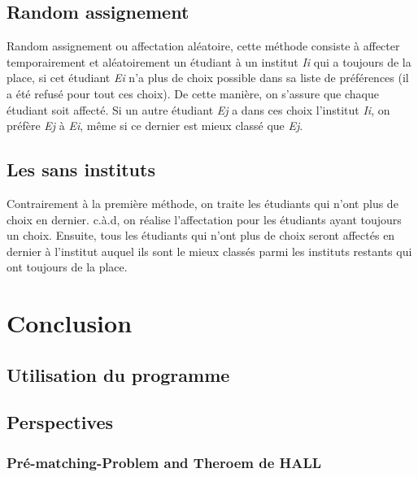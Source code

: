 \documentclass[12pt,titlepage]{article}
\begin{document}
\subsection{Random assignement}
Random assignement ou affectation aléatoire, cette méthode consiste à affecter temporairement et aléatoirement un étudiant à un institut \textit{Ii} qui a toujours de la place, si cet étudiant \textit{Ei} n'a plus de choix possible dans sa liste de préférences (il a été refusé pour tout ces choix). De cette manière, on s'assure que chaque étudiant soit affecté. Si un autre étudiant \textit{Ej} a dans ces choix l'institut \textit{Ii}, on préfère \textit{Ej} à \textit{Ei}, même si ce dernier est mieux classé que \textit{Ej}.
\subsection{Les sans instituts}
Contrairement à la première méthode, on traite les étudiants qui n'ont plus de choix en dernier. c.à.d, on réalise l'affectation pour les étudiants ayant toujours un choix. Ensuite, tous les étudiants qui n'ont plus de choix seront affectés en dernier à l'institut auquel ils sont le mieux classés parmi les instituts restants qui ont toujours de la place.
\section{Conclusion}

\subsection{Utilisation du programme}


\subsection{Perspectives}

\subsubsection{Pré-matching-Problem and Theroem de HALL}
\end{document}
